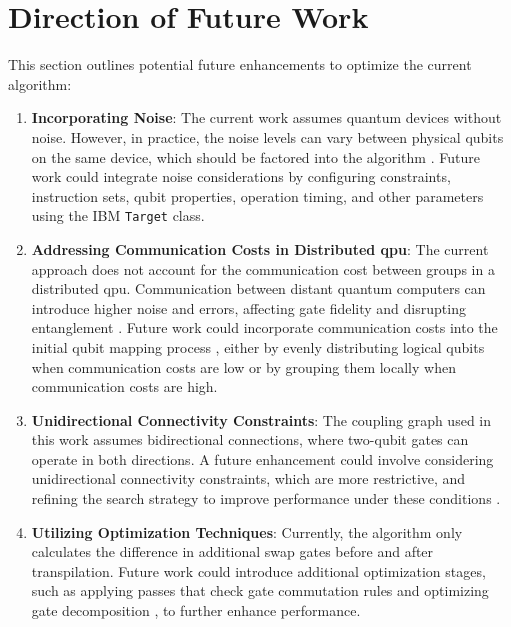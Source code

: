 \section{Direction of Future Work} %
This section outlines potential future enhancements to optimize the current algorithm:
\begin{enumerate}
    \item \textbf{Incorporating Noise}: The current work assumes quantum devices without noise. However, in practice, the noise levels can vary between physical qubits on the same device, which should be factored into the algorithm \cite{niu_hardware_2020}. Future work could integrate noise considerations by configuring constraints, instruction sets, qubit properties, operation timing, and other parameters using the IBM \lstinline{Target} \cite{ibmquantum_target} class.
    \item \textbf{Addressing Communication Costs in Distributed \acrshort{qpu}}: The current approach does not account for the communication cost between groups in a distributed \acrshort{qpu}. Communication between distant quantum computers can introduce higher noise and errors, affecting gate fidelity and disrupting entanglement \cite{murali_noise_adaptive_2019}. Future work could incorporate communication costs into the initial qubit mapping process \cite{houshmand_evolutionary_2020}, either by evenly distributing logical qubits when communication costs are low or by grouping them locally when communication costs are high.
    \item \textbf{Unidirectional Connectivity Constraints}: The coupling graph used in this work assumes bidirectional connections, where two-qubit gates can operate in both directions. A future enhancement could involve considering unidirectional connectivity constraints, which are more restrictive, and refining the search strategy to improve performance under these conditions \cite{sanaei_one_2019}.
    \item \textbf{Utilizing Optimization Techniques}: Currently, the algorithm only calculates the difference in additional swap gates before and after transpilation. Future work could introduce additional optimization stages, such as applying passes that check gate commutation rules \cite{itoko_quantum_2019} and optimizing gate decomposition \cite{rudolph_decomposition_2024}, to further enhance performance.
\end{enumerate}